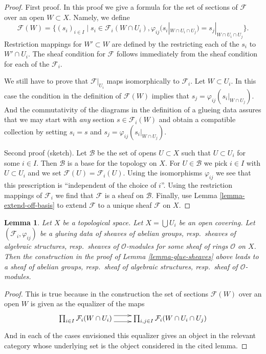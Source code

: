 \documentclass{stacks-project}
\theoremstyle{plain}
\newtheorem{lemma}[subsection]{Lemma}
\theoremstyle{definition}
\theoremstyle{remark}
\numberwithin{equation}{subsection}
\begin{document}
\begin{proof}
First proof. In this proof we give a formula for the set of sections
of $\mathcal{F}$ over an open $W \subset X$. Namely, we define
$$
\mathcal{F}(W) =
\{
(s_i)_{i \in I} \mid
s_i \in \mathcal{F}_i(W \cap U_i),
\varphi_{ij}(s_i|_{W \cap U_i \cap U_j}) = s_j|_{W \cap U_i \cap U_j}
\}.
$$
Restriction mappings for $W' \subset W$ are defined by the restricting
each of the $s_i$ to $W' \cap U_i$. The sheaf condition for $\mathcal{F}$
follows immediately from the sheaf condition for each of the
$\mathcal{F}_i$.

\medskip\noindent
We still have to prove that $\mathcal{F}|_{U_i}$ maps
isomorphically to $\mathcal{F}_i$. Let $W \subset U_i$.
In this case the condition in the definition of
$\mathcal{F}(W)$ implies that $s_j = \varphi_{ij}(s_i|_{W \cap U_j})$.
And the commutativity of the diagrams in the definition
of a glueing data assures that we may start with {\it any}
section $s \in \mathcal{F}_i(W)$ and obtain a compatible
collection by setting $s_i = s$ and $s_j = \varphi_{ij}(s_i|_{W \cap U_j})$.

\medskip\noindent
Second proof (sketch). Let $\mathcal{B}$ be the set of opens $U \subset X$
such that $U \subset U_i$ for some $i \in I$. Then $\mathcal{B}$
is a base for the topology on $X$. For $U \in \mathcal{B}$ we pick
$i \in I$ with $U \subset U_i$ and we set $\mathcal{F}(U) = \mathcal{F}_i(U)$.
Using the isomorphisms $\varphi_{ij}$ we see that this prescription
is ``independent of the choice of $i$''. Using the restriction mappings
of $\mathcal{F}_i$ we find that $\mathcal{F}$ is a sheaf on $\mathcal{B}$.
Finally, use Lemma \ref{lemma-extend-off-basis} to extend $\mathcal{F}$
to a unique sheaf $\mathcal{F}$ on $X$.
\end{proof}

\begin{lemma}
\label{lemma-glue-sheaves-structures}
Let $X$ be a topological space.
Let $X = \bigcup U_i$ be an open covering.
Let $(\mathcal{F}_i, \varphi_{ij})$ be a glueing data
of sheaves of abelian groups, resp.\ sheaves of algebraic structures,
resp.\ sheaves of $\mathcal{O}$-modules for some sheaf of rings
$\mathcal{O}$ on $X$. Then the construction in the proof of
Lemma \ref{lemma-glue-sheaves} above leads to a sheaf
of abelian groups, resp.\ sheaf of algebraic structures,
resp.\ sheaf of $\mathcal{O}$-modules.
\end{lemma}

\begin{proof}
This is true because in the construction the set of sections
$\mathcal{F}(W)$ over an open $W$ is given as the
equalizer of the maps
$$
\xymatrix{
\prod_{i \in I} \mathcal{F}_i(W \cap U_i)
\ar@<1ex>[r]
\ar@<-1ex>[r]
&
\prod_{i, j\in I} \mathcal{F}_i(W \cap U_i \cap U_j)
}
$$
And in each of the cases envisioned this equalizer gives
an object in the relevant category whose underlying set is
the object considered in the cited lemma.
\end{proof}
\end{document}
